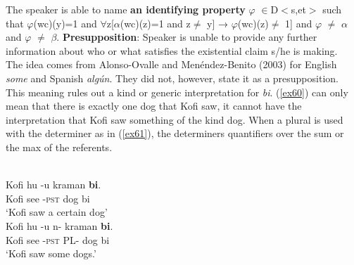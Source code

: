 \documentclass[output=paper,modfonts]{langsci/langscibook}
\begin{document}
\ex \label{51} The speaker is able to name \textbf{an identifying property} $\varphi$ $\in$D$<$s,et$>$ such that $\varphi$(wc)(y)=1 and $\forall$z[$\alpha$(wc)(z)=1 and z$\neq$ y] → $\varphi$(wc)(z)$\neq$ 1] and $\varphi$ $\neq$ $\alpha$ and $\varphi$ $\neq$ $\beta$.
\ex \textbf{Presupposition}: Speaker is unable to provide any further information about who or what satisfies the existential claim s/he is making.\\ The idea comes from Alonso-Ovalle and Menéndez-Benito (2003) for English \emph{some} and Spanish \emph{alg\'un}. They did not, however, state it as a presupposition.  
\z \z This meaning rules out a kind or generic interpretation for \emph{bi}. (\ref{ex60}) can only mean that there is exactly one dog that Kofi saw, it cannot have the interpretation that Kofi saw something of the kind dog. When a plural is used with the determiner as in (\ref{ex61}), the determiners quantifiers over the sum or the max of the referents.

\ea {}\\
\ea\label{ex60}
\gll Kofi hu -u kraman \textbf{bi}.\\
Kofi see -\textsc{pst} dog bi\\
\glt `Kofi saw a certain dog'\\
	
\ex \label{ex61}
\gll Kofi hu -u n-  kraman \textbf{bi}.\\
     Kofi see -\textsc{pst} PL- dog bi\\
\glt     `Kofi saw some dogs.' 
\end{document}
